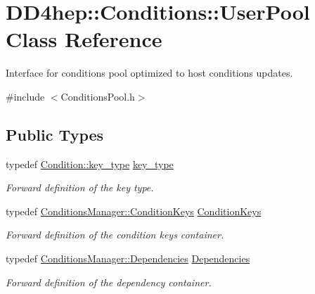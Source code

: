 \hypertarget{class_d_d4hep_1_1_conditions_1_1_user_pool}{
\section{DD4hep::Conditions::UserPool Class Reference}
\label{class_d_d4hep_1_1_conditions_1_1_user_pool}
}


Interface for conditions pool optimized to host conditions updates.  


{\ttfamily \#include $<$ConditionsPool.h$>$}\subsection*{Public Types}
\begin{DoxyCompactItemize}
\item 
typedef \hyperlink{class_d_d4hep_1_1_conditions_1_1_condition_a7528efa762e8cc072ef80ea67c3531f9}{Condition::key\_\-type} \hyperlink{class_d_d4hep_1_1_conditions_1_1_user_pool_aa256cf1e22de1b9f2a84d39309b8bfa9}{key\_\-type}
\begin{DoxyCompactList}\small\item\em Forward definition of the key type. \item\end{DoxyCompactList}\item 
typedef \hyperlink{class_d_d4hep_1_1_conditions_1_1_conditions_manager_a8dd76f9acef2c8d3b7970e266fe7eff6}{ConditionsManager::ConditionKeys} \hyperlink{class_d_d4hep_1_1_conditions_1_1_user_pool_a6282d01af77401a4c20f08391d18cc95}{ConditionKeys}
\begin{DoxyCompactList}\small\item\em Forward definition of the condition keys container. \item\end{DoxyCompactList}\item 
typedef \hyperlink{class_d_d4hep_1_1_conditions_1_1_conditions_dependency_collection}{ConditionsManager::Dependencies} \hyperlink{class_d_d4hep_1_1_conditions_1_1_user_pool_a0da9a8bee4190e4deebf83102902118d}{Dependencies}
\begin{DoxyCompactList}\small\item\em Forward definition of the dependency container. \item\end{DoxyCompactList}\end{DoxyCompactItemize}

